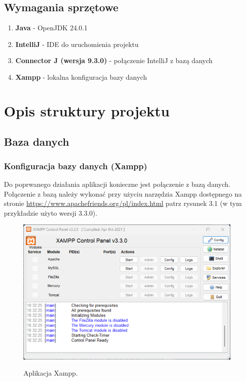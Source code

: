 \section{Wymagania sprzętowe}
\begin{enumerate}
    \item \textbf{Java} - OpenJDK 24.0.1
    \item \textbf{IntelliJ} - IDE do uruchomienia projektu
    \item \textbf{Connector J (wersja 9.3.0)} - połączenie IntelliJ z bazą danych
    \item \textbf{Xampp} - lokalna konfiguracja bazy danych
\end{enumerate}
\chapter{Opis struktury projektu}
\section{Baza danych}
\subsection{Konfiguracja bazy danych (Xampp)}
Do poprwanego działania aplikacji konieczne jest połączenie z bazą danych.
Połączenie z bazą należy wykonać przy użyciu narzędzia Xampp dostępnego na stronie 
\url{https://www.apachefriends.org/pl/index.html} patrz rysunek 3.1 
(w tym przykładzie użyto wersji 3.3.0).

\begin{figure}[H]
    \centering
    \includegraphics[width=\linewidth]{figures/xampp.png}\\
    \caption{Aplikacja Xampp.\label{fig1}}
\end{figure}

